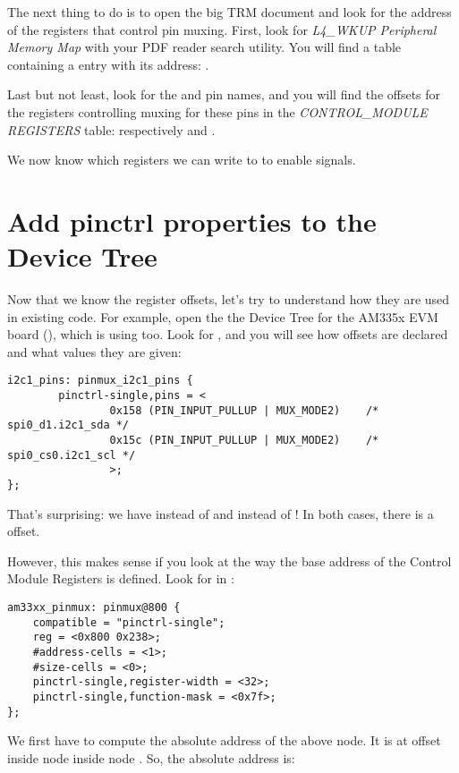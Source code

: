 The next thing to do is to open the big TRM document and look for the
address of the registers that control pin muxing. First, look for
{\em L4\_WKUP Peripheral Memory Map} with your PDF reader search
utility. You will find a table containing a
 entry with its address:
.

Last but not least, look for the  and 
pin names, and you will find the offsets for the registers controlling
muxing for these pins in the {\em CONTROL\_MODULE REGISTERS} table:
respectively  and .

We now know which registers we can write to to enable 
signals.

\section{Add pinctrl properties to the Device Tree}

Now that we know the register offsets, let's try to understand
how they are used in existing code. For example, open the
the Device Tree for the AM335x EVM board
(), which is using
 too. Look for , and you will see how
offsets are declared and what values they are given:

\begin{verbatim}
i2c1_pins: pinmux_i2c1_pins {
        pinctrl-single,pins = <
                0x158 (PIN_INPUT_PULLUP | MUX_MODE2)    /* spi0_d1.i2c1_sda */
                0x15c (PIN_INPUT_PULLUP | MUX_MODE2)    /* spi0_cs0.i2c1_scl */
                >;
};
\end{verbatim}

That's surprising: we have  instead of 
and  instead of ! In both cases, there is a
 offset.

However, this makes sense if you look at the way the base address of the
Control Module Registers is defined. Look for  in
:

\begin{verbatim}
am33xx_pinmux: pinmux@800 {
	compatible = "pinctrl-single";
	reg = <0x800 0x238>;
	#address-cells = <1>;
	#size-cells = <0>;
	pinctrl-single,register-width = <32>;
	pinctrl-single,function-mask = <0x7f>;
};
\end{verbatim}

We first have to compute the absolute address of the above node. It is
at offset  inside node  inside node
. So, the absolute address is:

